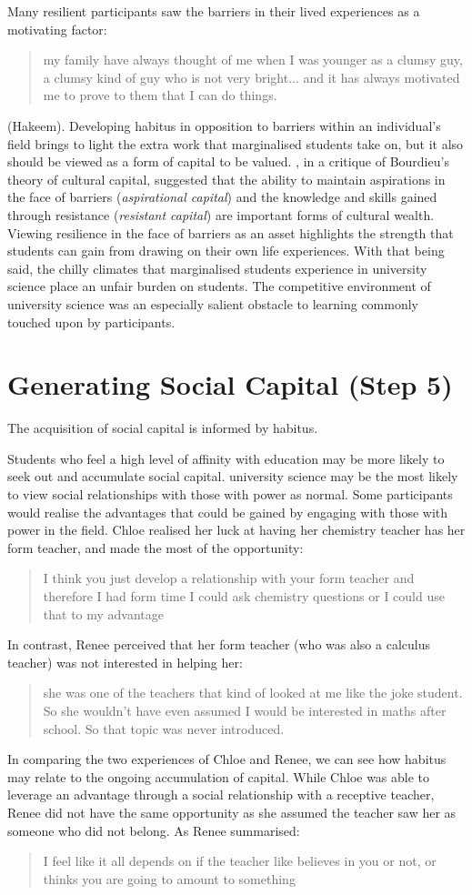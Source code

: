 Many resilient participants saw the barriers in their lived experiences as a motivating factor: 
\blockquote{my family have always thought of me when I was younger as a clumsy guy, a clumsy kind of guy who is not very bright... and it has always motivated me to prove to them that I can do things.} (Hakeem).  Developing habitus in opposition to barriers within an individual's field brings to light the extra work that marginalised students take on, but it also should be viewed as a form of capital to be valued. \cite{yosso2005whose}, in a critique of Bourdieu's theory of cultural capital, suggested that the ability to maintain aspirations in the face of barriers (\textit{aspirational capital}) and the knowledge and skills gained through resistance (\textit{resistant capital}) are important forms of cultural wealth. Viewing resilience in the face of barriers as an asset highlights the strength that students can gain from drawing on their own life experiences. With that being said, the chilly climates \citep{Blickenstaff_2005} that marginalised students experience in university science place an unfair burden on students. The competitive environment of university science was an especially salient obstacle to learning commonly touched upon by participants.



\section{Generating Social Capital (Step 5)}
The acquisition of social capital is informed by habitus. 

Students who feel a high level of affinity with education may be more likely to seek out and accumulate social capital. university science may be the most likely to view social relationships with those with power as normal. Some participants would realise the advantages that could be gained by engaging with those with power in the field. Chloe realised her luck at having her chemistry teacher has her form teacher, and made the most of the opportunity: \blockquote{I think you just develop a relationship with your form teacher and therefore I had form time I could ask chemistry questions or I could use that to my advantage}. In contrast, Renee perceived that her form teacher (who was also a calculus teacher) was not interested in helping her: \blockquote{she was one of the teachers that kind of looked at me like the joke student. So she wouldn't have even assumed I would be interested in maths after school. So that topic was never introduced.} In comparing the two experiences of Chloe and Renee, we can see how habitus may relate to the ongoing accumulation of capital. While Chloe was able to leverage an advantage through a social relationship with a receptive teacher, Renee did not have the same opportunity as she assumed the teacher saw her as someone who did not belong. As Renee summarised: \blockquote{I feel like it all depends on if the teacher like believes in you or not, or thinks you are going to amount to something}.


